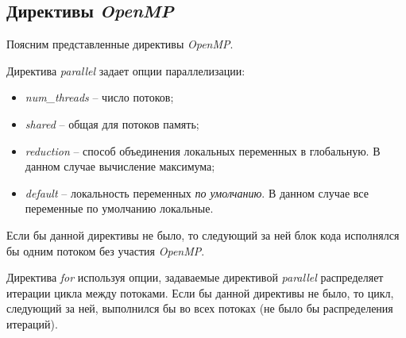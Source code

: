 \subsection{Директивы \textit{OpenMP}}

Поясним представленные директивы \textit{OpenMP}.

Директива \textit{parallel} задает опции параллелизации:
\begin{itemize}
    \item \textit{num\_threads} -- число потоков;
    \item \textit{shared} -- общая для потоков память;
    \item \textit{reduction} -- способ объединения локальных переменных в глобальную. В данном случае вычисление максимума;
    \item \textit{default} -- локальность переменных \textit{по умолчанию}. В данном случае все переменные по умолчанию локальные.
\end{itemize}
Если бы данной директивы не было, то следующий за ней блок кода исполнялся бы одним потоком без участия \textit{OpenMP}. 

Директива \textit{for} используя опции, задаваемые директивой \textit{parallel} распределяет итерации цикла между потоками.
Если бы данной директивы не было, то цикл, следующий за ней, выполнился бы во всех потоках (не было бы распределения итераций).
